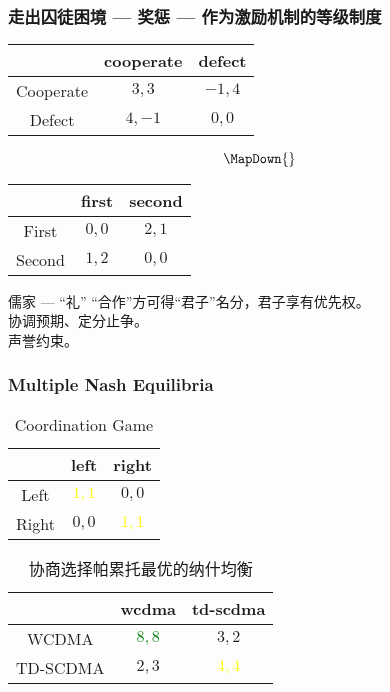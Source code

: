 \documentclass[UTF8,11pt,colorlinks,compress,openany]{beamer}%
\begin{document}
\begin{frame}\frametitle{走出囚徒困境 --- 奖惩 --- 作为激励机制的等级制度}
\begin{table}
\begin{tabu}{c|cc}
\hline
 & cooperate & defect\\
\hline
Cooperate & $3,3$ & $-1,4$\\
Defect & $4,-1$ & $0,0$\\
\hline
\end{tabu}
\[\MapDown{}\]
\begin{tabu}{c|cc}
\hline
 & first & second\\
\hline
First & $0,0$ & $2,1$\\
Second & $1,2$ & $0,0$\\
\hline
\end{tabu}
\end{table}
\begin{block}{儒家 --- “礼”}
“合作”方可得“君子”名分，君子享有优先权。\\
协调预期、定分止争。\\
声誉约束。
\end{block}
\end{frame}

\begin{frame}\frametitle{Multiple Nash Equilibria}
\begin{table}
\begin{tabu}{c|cc}
\hline
 & left & right\\
\hline
Left & \textcolor{yellow}{$1,1$} & $0,0$\\
Right & $0,0$ & \textcolor{yellow}{$1,1$}\\
\hline
\end{tabu}\caption{Coordination Game}
\end{table}
\begin{table}
\begin{tabu}{c|cc}
\hline
 & wcdma & td-scdma\\
\hline
WCDMA & \textcolor{green}{$8,8$} & $3,2$\\
TD-SCDMA & $2,3$ & \textcolor{yellow}{$4,4$}\\
\hline
\end{tabu}\caption{协商选择帕累托最优的纳什均衡}
\end{table}
\end{frame}
\end{document}
